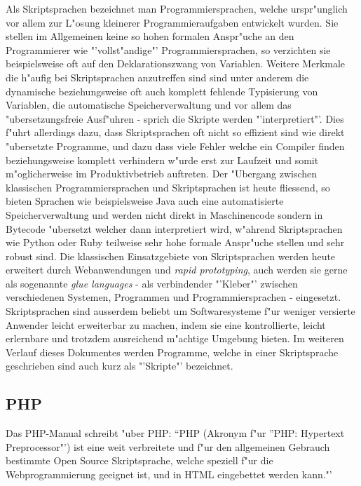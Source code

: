 Als Skriptsprachen bezeichnet man Programmiersprachen, welche urspr"unglich vor allem zur L"osung
kleinerer Programmieraufgaben entwickelt wurden. Sie stellen im Allgemeinen keine so hohen formalen 
Anspr"uche an den Programmierer wie "'vollst"andige"' Programmiersprachen, so verzichten sie
beispielsweise oft auf den Deklarationszwang von Variablen. Weitere Merkmale die h"aufig bei
Skriptsprachen anzutreffen sind sind unter anderem die dynamische beziehungsweise oft auch komplett 
fehlende Typisierung von Variablen, die automatische Speicherverwaltung und vor allem das
"ubersetzungsfreie Ausf"uhren - sprich die Skripte werden "'interpretiert"'. Dies f"uhrt allerdings
dazu, dass Skriptsprachen oft nicht so effizient sind wie direkt "ubersetzte Programme, und dazu
dass viele Fehler welche ein Compiler finden beziehungsweise komplett verhindern w"urde erst zur
Laufzeit und somit m"oglicherweise im Produktivbetrieb auftreten.
Der "Ubergang zwischen klassischen Programmiersprachen und Skriptsprachen ist heute fliessend, so 
bieten Sprachen wie beispielsweise Java auch eine automatisierte Speicherverwaltung und werden nicht
direkt in Maschinencode sondern in Bytecode "ubersetzt welcher dann interpretiert wird, w"ahrend 
Skriptsprachen wie Python oder Ruby teilweise sehr hohe formale Anspr"uche stellen und sehr robust sind.
Die klassischen Einsatzgebiete von Skriptsprachen werden heute erweitert durch Webanwendungen und
\emph{rapid prototyping}, auch werden sie gerne als sogenannte \emph{glue languages} - als 
verbindender "'Kleber"' zwischen verschiedenen Systemen, Programmen und Programmiersprachen -
eingesetzt. Skriptsprachen sind ausserdem beliebt um Softwaresysteme f"ur weniger versierte Anwender
leicht erweiterbar zu machen, indem sie eine kontrollierte, leicht erlernbare und trotzdem 
ausreichend m"achtige Umgebung bieten.
Im weiteren Verlauf dieses Dokumentes werden Programme, welche in einer Skriptsprache geschrieben sind 
auch kurz als "'Skripte"' bezeichnet.

\subsection{PHP}
\label{sec:intro:stand:php}

Das PHP-Manual \cite{PHPMAN} schreibt "uber PHP: "`PHP (Akronym f"ur "'PHP: Hypertext Preprocessor"') 
ist eine weit verbreitete und f"ur den allgemeinen Gebrauch bestimmte Open Source Skriptsprache, 
welche speziell f"ur die Webprogrammierung geeignet ist, und in HTML eingebettet werden kann."'

